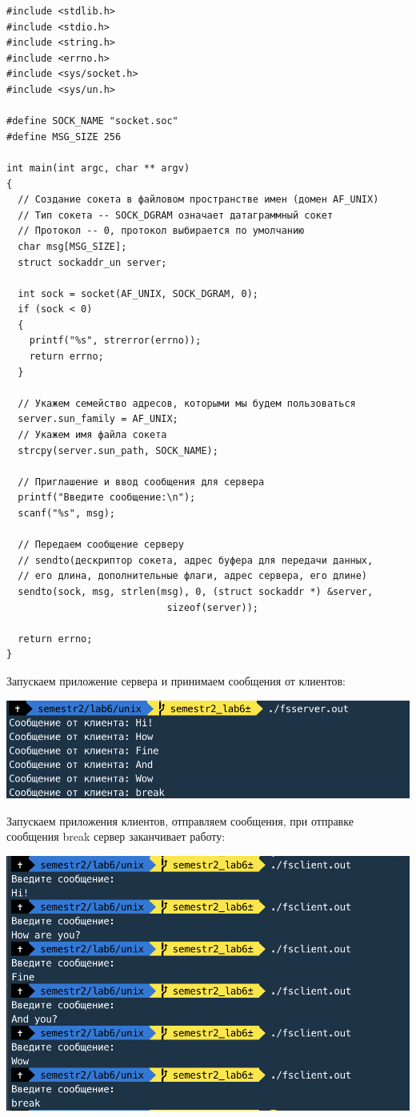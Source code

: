 \documentclass[a4paper,14pt]{extreport} %
\begin{document}
\begin{lstlisting}[caption=Код клиента]
#include <stdlib.h>
#include <stdio.h>
#include <string.h>
#include <errno.h>
#include <sys/socket.h>
#include <sys/un.h>

#define SOCK_NAME "socket.soc"
#define MSG_SIZE 256

int main(int argc, char ** argv)
{
  // Создание сокета в файловом пространстве имен (домен AF_UNIX)
  // Тип сокета -- SOCK_DGRAM означает датаграммный сокет
  // Протокол -- 0, протокол выбирается по умолчанию
  char msg[MSG_SIZE];
  struct sockaddr_un server;

  int sock = socket(AF_UNIX, SOCK_DGRAM, 0);
  if (sock < 0)
  {
    printf("%s", strerror(errno));
    return errno;
  }

  // Укажем семейство адресов, которыми мы будем пользоваться
  server.sun_family = AF_UNIX;
  // Укажем имя файла сокета
  strcpy(server.sun_path, SOCK_NAME);

  // Приглашение и ввод сообщения для сервера
  printf("Введите сообщение:\n");
  scanf("%s", msg);

  // Передаем сообщение серверу
  // sendto(дескриптор сокета, адрес буфера для передачи данных, 
  // его длина, дополнительные флаги, адрес сервера, его длине)
  sendto(sock, msg, strlen(msg), 0, (struct sockaddr *) &server, 
  							sizeof(server));

  return errno;
}
\end{lstlisting}

Запускаем приложение сервера и принимаем сообщения от клиентов:

\includegraphics{server1}

\newpage

Запускаем приложения клиентов, отправляем сообщения, при отправке сообщения break сервер заканчивает работу:

\includegraphics{client1}
\end{document}
